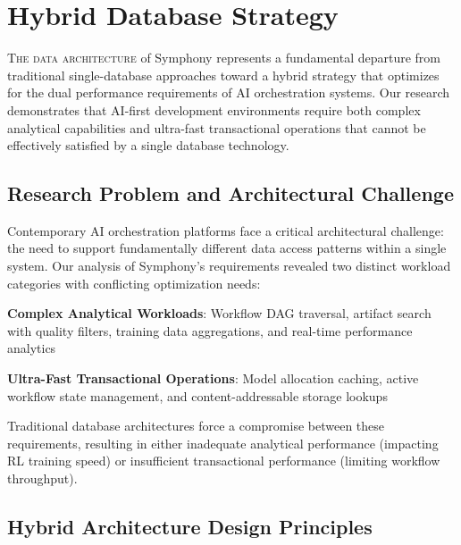 
\section*{Hybrid Database Strategy}

\lettrine{T}{he data architecture} of Symphony represents a fundamental departure from traditional single-database approaches toward a hybrid strategy that optimizes for the dual performance requirements of AI orchestration systems. Our research demonstrates that AI-first development environments require both complex analytical capabilities and ultra-fast transactional operations that cannot be effectively satisfied by a single database technology.

\subsection*{Research Problem and Architectural Challenge}

Contemporary AI orchestration platforms face a critical architectural challenge: the need to support fundamentally different data access patterns within a single system. Our analysis of Symphony's requirements revealed two distinct workload categories with conflicting optimization needs:

\begin{expandedlist}
    \item \textbf{Complex Analytical Workloads}: Workflow DAG traversal, artifact search with quality filters, training data aggregations, and real-time performance analytics
    \item \textbf{Ultra-Fast Transactional Operations}: Model allocation caching, active workflow state management, and content-addressable storage lookups
\end{expandedlist}

Traditional database architectures force a compromise between these requirements, resulting in either inadequate analytical performance (impacting RL training speed) or insufficient transactional performance (limiting workflow throughput).

\subsection*{Hybrid Architecture Design Principles}

